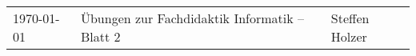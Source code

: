 


\geometry{margin=2cm}

\noindent
\begin{tabular}{R{0.2\textwidth}|C{0.55\textwidth}|L{0.2\textwidth}}
\today&Übungen zur Fachdidaktik Informatik -- Blatt 2&Steffen Holzer
\end{tabular}
